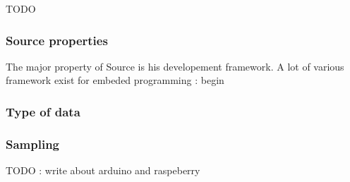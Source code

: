 TODO

\subsubsection{Source properties}
\label{sec:dsl-design-source-properties}

The major property of Source is his developement framework. A lot of various framework exist for embeded programming :
begin

\subsubsection{Type of data}
\label{sec:dsl-design-type-of-data}

\subsubsection{Sampling}
\label{sec:dsl-design-sampling}


TODO : write about arduino and raspeberry

